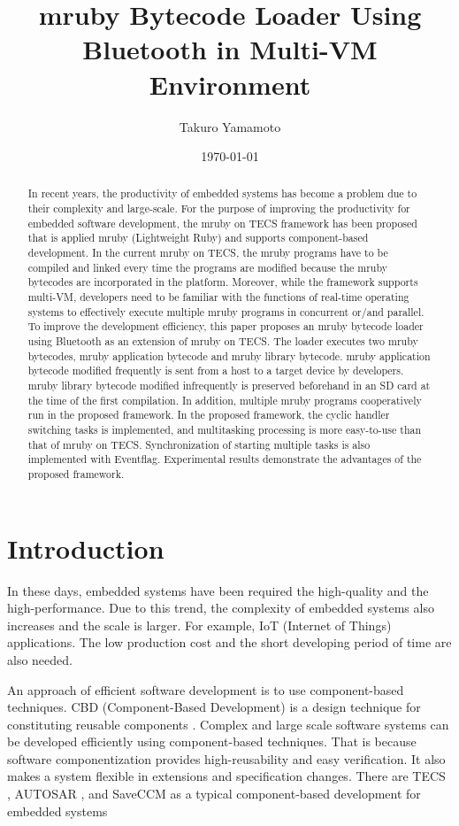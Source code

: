 \documentclass[conference,compsoc]{IEEEtran}
\title{mruby Bytecode Loader Using Bluetooth in Multi-VM Environment}
\author{Takuro Yamamoto}
\date{\today}
\begin{document}
\maketitle
\begin{abstract}
In recent years, the productivity of embedded systems has become a problem due to their complexity and large-scale.
For the purpose of improving the productivity for embedded software development, the mruby on TECS framework has been proposed that is applied mruby (Lightweight Ruby) and supports component-based development.
In the current mruby on TECS, the mruby programs have to be compiled and linked every time the programs are modified because the mruby bytecodes are incorporated in the platform.
Moreover, while the framework supports multi-VM, developers need to be familiar with the functions of real-time operating systems to effectively execute multiple mruby programs in concurrent or/and parallel.
To improve the development efficiency, this paper proposes an mruby bytecode loader using Bluetooth as an extension of mruby on TECS.
The loader executes two mruby bytecodes, mruby application bytecode and mruby library bytecode.
mruby application bytecode modified frequently is sent from a host to a target device by developers.
mruby library bytecode modified infrequently is preserved beforehand in an SD card at the time of the first compilation.
In addition, multiple mruby programs cooperatively run in the proposed framework.
In the proposed framework, the cyclic handler switching tasks is implemented, and multitasking processing is more easy-to-use than that of mruby on TECS.
Synchronization of starting multiple tasks is also implemented with Eventflag. 
Experimental results demonstrate the advantages of the proposed framework.
\end{abstract}
\section{Introduction}
In these days, embedded systems have been required the high-quality and the high-performance.
Due to this trend, the complexity of embedded systems also increases and the scale is larger.
For example, IoT (Internet of Things) applications.
The low production cost and the short developing period of time are also needed.

An approach of efficient software development is to use component-based techniques.
CBD (Component-Based Development) is a design technique for constituting reusable components \cite{par:Crnkovic}.
Complex and large scale software systems can be developed efficiently using component-based techniques.
That is because software componentization provides high-reusability and easy verification.
It also makes a system flexible in extensions and specification changes.
There are TECS \cite{par:TECS}, AUTOSAR \cite{url:AUTOSAR}, and SaveCCM \cite{par:SAVEapproach} as a typical component-based development for embedded systems 
\end{document}
